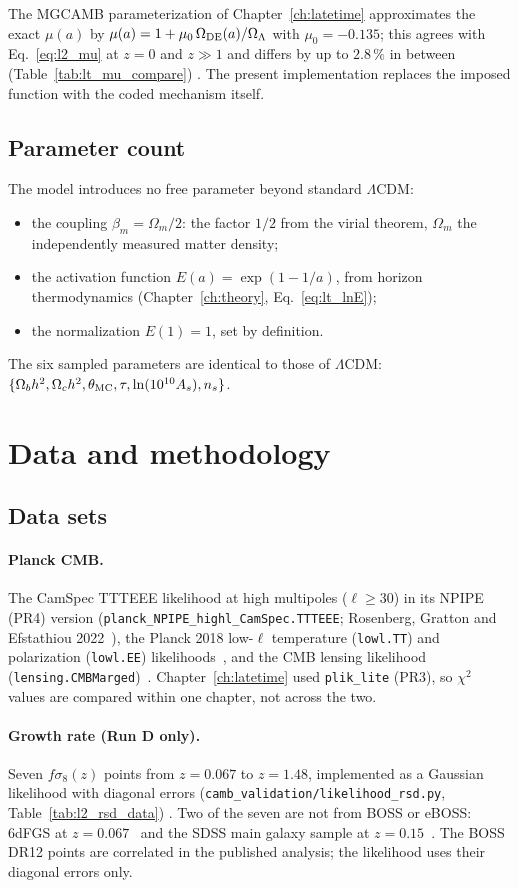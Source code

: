 The MGCAMB parameterization of Chapter~\ref{ch:latetime} approximates the exact $\mu(a)$ by $\mu(a)=1+\mu_0\,\Omega_{\rm DE}(a)/\Omega_\Lambda$ with
$\mu_0=-0.135$; this agrees with Eq.~\eqref{eq:l2_mu} at $z=0$ and $z\gg1$ and differs by up to $2.8\,\%$ in between (Table~\ref{tab:lt_mu_compare})
\calc. The present implementation replaces the imposed function with the coded mechanism itself.

\subsection{Parameter count}
The model introduces no free parameter beyond standard $\Lambda$CDM:
\begin{itemize}
\item the coupling $\beta_m=\Omega_m/2$: the factor $1/2$ from the virial theorem, $\Omega_m$ the independently measured matter density;
\item the activation function $E(a)=\exp(1-1/a)$, from horizon thermodynamics (Chapter~\ref{ch:theory}, Eq.~\eqref{eq:lt_lnE});
\item the normalization $E(1)=1$, set by definition.
\end{itemize}
The six sampled parameters are identical to those of $\Lambda$CDM: $\{\Omega_bh^2,\Omega_ch^2,\theta_{\rm MC},\tau,\ln(10^{10}A_s),n_s\}$.

\section{Data and methodology}\label{sec:l2_data}
\subsection{Data sets}
\paragraph{Planck CMB.} The CamSpec TTTEEE likelihood at high multipoles ($\ell\ge30$) in its NPIPE (PR4) version
(\texttt{planck\_NPIPE\_highl\_CamSpec.TTTEEE}; Rosenberg, Gratton and Efstathiou 2022~\cite{Rosenberg2022}), the Planck 2018 low-$\ell$
temperature (\texttt{lowl.TT}) and polarization (\texttt{lowl.EE}) likelihoods~\cite{Planck2018V}, and the CMB lensing likelihood
(\texttt{lensing.CMBMarged})~\cite{Planck2018VIII}. Chapter~\ref{ch:latetime} used \texttt{plik\_lite} (PR3), so $\chi^2$ values are compared within
one chapter, not across the two.

\paragraph{Growth rate (Run D only).} Seven $f\sigma_8(z)$ points from $z=0.067$ to $z=1.48$, implemented as a Gaussian likelihood with diagonal
errors (\texttt{camb\_validation/likelihood\_rsd.py}, Table~\ref{tab:l2_rsd_data}) \observed. Two of the seven are not from BOSS or eBOSS: 6dFGS at
$z=0.067$~\cite{Beutler2012} and the SDSS main galaxy sample at $z=0.15$~\cite{Howlett2015}. The BOSS DR12 points are correlated in the published
analysis; the likelihood uses their diagonal errors only.

